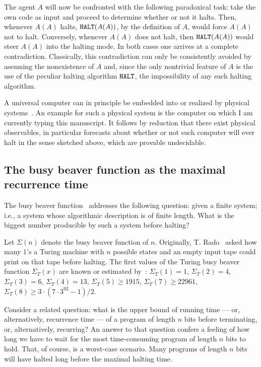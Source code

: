 \documentclass[rmp,amsfonts,showpacs,showkeys,twocolumn]{revtex4}
\begin{document}
The agent $A$ will now be confronted with the following paradoxical
task:  take the own code as input and proceed to determine whether or not it halts.
Then, whenever $A(A)$
halts, ${\tt HALT}(A(A))$, by the definition of $A$, would force $A(A)$ not to halt.
Conversely,
whenever $A(A)$ does not halt, then ${\tt HALT}(A(A))$ would steer
$A(A)$ into the halting mode.  In both cases one arrives at a complete
contradiction.  Classically, this contradiction can only be consistently
avoided by assuming the nonexistence of $A$ and, since the only
nontrivial feature of $A$ is the use of the peculiar halting algorithm
${\tt HALT}$, the impossibility of any such halting algorithm.


A universal computer can in principle be embedded into or realized by
physical systems~\cite{moore}.
An example for such a physical system is the computer
on which I am currently typing this manuscript.
It follows by reduction that there exist physical observables,
in particular forecasts about whether or not such computer will ever
halt in the sense sketched above,
which are provable undecidable.




\subsection{The busy beaver function as the maximal recurrence time}

The busy beaver function~\cite{rado,chaitin-ACM,dewdney,brady}
addresses the following
question: given a finite system;
i.e., a system whose algorithmic description is of finite length.
What is the biggest number producible by such a system before halting?

Let $\Sigma (n)$ denote the busy beaver function of $n$.
 Originally, T. Rado~\cite{rado}
 asked how
 many $1$'s a Turing machine with $n$ possible states and an empty
 input tape
 could print on that tape before halting.
 The first values of the Turing busy beaver function $\Sigma _T(x)$
 are known or estimated by~\cite{dewdney,brady}:
  $\Sigma _T(1)=1$,
 $\Sigma _T(2)= 4$,
  $\Sigma _T(3)=6$,
 $\Sigma _T(4)= 13$,
 $\Sigma _T(5) \ge 1915$,
 $\Sigma_T(7)\ge 22961$,
 $\Sigma_T(8)\ge 3\cdot (7\cdot 3^{92}-1)/2$.

Consider a related question: what is the upper bound of running time --- or,
alternatively, recurrence time --- of a program of length $n$ bits before
terminating, or, alternatively, recurring?
An answer to that question confers a feeling of how long we have to
wait for the most time-consuming program of length $n$ bits to
hold. That, of course, is a worst-case scenario. Many programs of
length $n$ bits will have halted long  before the maximal halting time.
\end{document}
